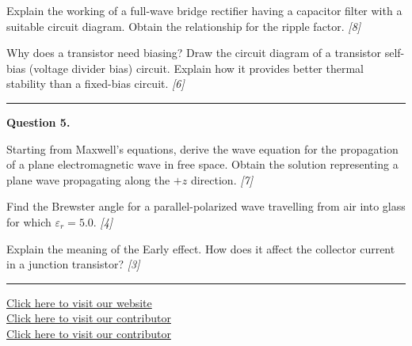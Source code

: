 \documentclass[11pt,a4paper]{article}
\newcommand{\pts}[1]{\hfill   \textit{[#1]}}
\begin{document}
\begin{parts}
  \item Explain the working of a full-wave bridge rectifier having a capacitor filter with a suitable circuit diagram. Obtain the relationship for the ripple factor. \pts{8}
  \item Why does a transistor need biasing? Draw the circuit diagram of a transistor self-bias (voltage divider bias) circuit. Explain how it provides better thermal stability than a fixed-bias circuit. \pts{6}
\end{parts}

\medskip\rule{\linewidth}{0.2pt}




\noindent   \textbf{Question 5.}

\begin{parts}
  \item Starting from Maxwell's equations, derive the wave equation for the propagation of a plane electromagnetic wave in free space. Obtain the solution representing a plane wave propagating along the $+z$ direction. \pts{7}
  \item Find the Brewster angle for a parallel-polarized wave travelling from air into glass for which $\varepsilon_r = 5.0$. \pts{4}
  \item Explain the meaning of the Early effect. How does it affect the collector current in a junction transistor? \pts{3}
\end{parts}

\vfill
\rule{\linewidth}{0.4pt}

\begin{center}\small
  \href{https://bhu-exam.vercel.app/}{Click here to visit our website}\\[4pt]
  \href{https://me-aryan.vercel.app/}{Click here to visit our contributor}\\[4pt]
  \href{https://quashan-me.vercel.app/}{Click here to visit our contributor}
\end{center}
\end{document}
